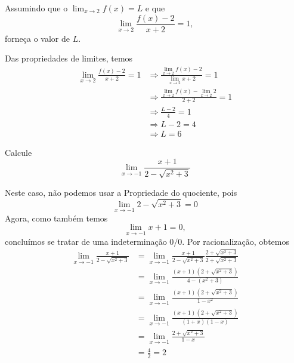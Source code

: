 \cleardoublepage\documentclass[../main.tex]{subfiles}
\begin{document}
\begin{exeresol}
  Assumindo que o $\displaystyle\lim_{x\to 2} f(x) = L$ e que
  \begin{equation*}
    \lim_{x\to 2} \frac{f(x)-2}{x+2} = 1,
  \end{equation*}
  forneça o valor de $L$.\\
  \begin{resol}
  Das propriedades de limites, temos
  \begin{align*}
    \lim_{x\to 2} \frac{f(x)-2}{x+2} = 1 &\Rightarrow \frac{\lim_{x\to 2} f(x)-2}{\lim_{x\to 2} x+2} = 1\\
                                         &\Rightarrow \frac{\lim_{x\to 2} f(x) - \lim_{x\to 2} 2}{2+2} = 1\\
                                         &\Rightarrow \frac{L-2}{4} = 1\\
                                         &\Rightarrow L-2 = 4\\
                                         &\Rightarrow L = 6
  \end{align*}
\end{resol}
  \end{exeresol}

\begin{exeresol}
  Calcule
  \begin{equation*}
    \lim_{x\to -1} \frac{x+1}{2-\sqrt{x^2+3}}
  \end{equation*}
  \begin{resol}
  Neste caso, não podemos usar a Propriedade do quociente, pois
  \begin{equation*}
    \lim_{x\to -1} 2-\sqrt{x^2+3} = 0
  \end{equation*}
  Agora, como também temos
  \begin{equation*}
    \lim_{x\to -1} x+1 = 0,
  \end{equation*}
  concluímos se tratar de uma indeterminação $0/0$. Por racionalização, obtemos
  \begin{align*}
    \lim_{x\to -1} \frac{x+1}{2-\sqrt{x^2+3}} &= \lim_{x\to -1} \frac{x+1}{2-\sqrt{x^2+3}}\frac{2+\sqrt{x^2+3}}{2+\sqrt{x^2+3}} \\
                                              &= \lim_{x\to -1} \frac{(x+1)(2+\sqrt{x^2+3})}{4 - (x^2+3)}\\
                                              &= \lim_{x\to -1} \frac{(x+1)(2+\sqrt{x^2+3})}{1-x^2}\\
                                              &= \lim_{x\to -1} \frac{(x+1)(2+\sqrt{x^2+3})}{(1+x)(1-x)}\\
                                              &= \lim_{x\to -1} \frac{2+\sqrt{x^2+3}}{1-x} \\
                                              &= \frac{4}{2} = 2
  \end{align*}
\end{resol}
\end{exeresol}
\end{document}
